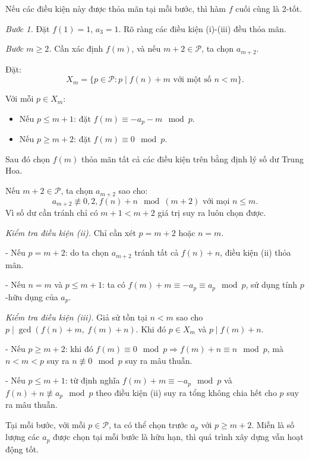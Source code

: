 \begin{problem}
\begin{soln}
    Nếu các điều kiện này được thỏa mãn tại mỗi bước, thì hàm \( f \) cuối cùng là 2-tốt.

    \textit{Bước 1.} Đặt \( f(1) = 1 \), \( a_3 = 1 \). Rõ ràng các điều kiện (i)-(iii) đều thỏa mãn.

    \textit{Bước \( m \ge 2 \).} Cần xác định \( f(m) \), và nếu \( m + 2 \in \mathcal{P} \), ta chọn \( a_{m+2} \).

    Đặt:
    \[
        X_m = \{ p \in \mathcal{P} : p \mid f(n) + m \text{ với một số } n < m \}.
    \]

    Với mỗi \( p \in X_m \):
    \begin{itemize}[topsep=0pt, partopsep=0pt, itemsep=0pt]
        \item Nếu \( p \le m + 1 \): đặt \( f(m) \equiv -a_p - m \mod p \).
        \item Nếu \( p \ge m + 2 \): đặt \( f(m) \equiv 0 \mod p \).
    \end{itemize}
    Sau đó chọn \( f(m) \) thỏa mãn tất cả các điều kiện trên bằng định lý số dư Trung Hoa.

    Nếu \( m + 2 \in \mathcal{P} \), ta chọn \( a_{m+2} \) sao cho:
    \[
        a_{m+2} \not\equiv 0, 2, f(n) + n \mod (m + 2) \text{ với mọi } n \le m.
    \]
    Vì số dư cần tránh chỉ có \( m + 1 < m + 2 \) giá trị suy ra luôn chọn được.

    \textit{Kiểm tra điều kiện (ii).} Chỉ cần xét \( p = m + 2 \) hoặc \( n = m \).

    - Nếu \( p = m + 2 \): do ta chọn \( a_{m+2} \) tránh tất cả \( f(n) + n \), điều kiện (ii) thỏa mãn.

    - Nếu \( n = m \) và \( p \le m + 1 \): ta có \( f(m) + m \equiv -a_p \equiv a_p \mod p \), sử dụng tính \( p \)-hữu dụng của \( a_p \).

    \textit{Kiểm tra điều kiện (iii).} Giả sử tồn tại \( n < m \) sao cho \( p \mid \gcd(f(n) + m,\ f(m) + n) \). Khi đó \( p \in X_m \) và \( p \mid f(m) + n \).

    - Nếu \( p \ge m + 2 \): khi đó \( f(m) \equiv 0 \mod p \Rightarrow f(m) + n \equiv n \mod p \), mà \( n < m < p \)
    suy ra \( n \not\equiv 0 \mod p \) suy ra mâu thuẫn.

    - Nếu \( p \le m + 1 \): từ định nghĩa \( f(m) + m \equiv -a_p \mod p \) và \( f(n) + n \not\equiv a_p \mod p \)
    theo điều kiện (ii) suy ra tổng không chia hết cho \( p \) suy ra mâu thuẫn.
\end{soln}

\begin{remark*}
    Tại mỗi bước, với mỗi \( p \in \mathcal{P} \), ta có thể chọn trước \( a_p \) với \( p \ge m + 2 \).
    Miễn là số lượng các \( a_p \) được chọn tại mỗi bước là hữu hạn, thì quá trình xây dựng vẫn hoạt động tốt.
\end{remark*}


\end{problem}
